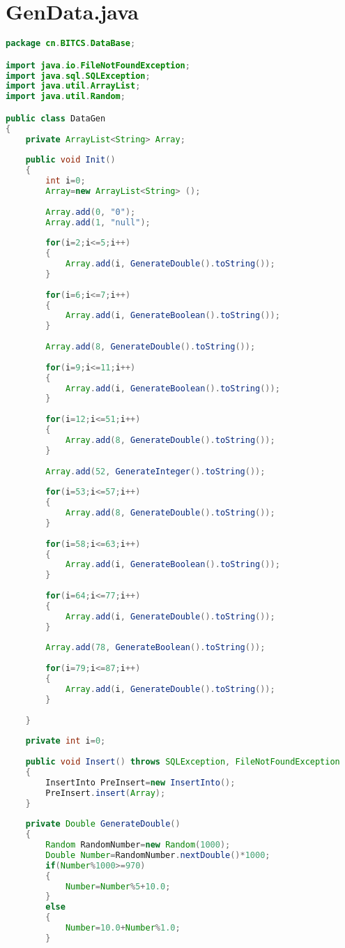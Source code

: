 
\label{Appendix A}

\section{GenData.java}
\label{Section A.1}

\begin{lstlisting}[language = Java]
package cn.BITCS.DataBase;

import java.io.FileNotFoundException;
import java.sql.SQLException;
import java.util.ArrayList;
import java.util.Random;

public class DataGen
{
	private ArrayList<String> Array;
	
	public void Init()
	{
		int i=0;
		Array=new ArrayList<String> ();
		
		Array.add(0, "0");
		Array.add(1, "null");
		
		for(i=2;i<=5;i++)
		{
			Array.add(i, GenerateDouble().toString());
		}
		
		for(i=6;i<=7;i++)
		{
			Array.add(i, GenerateBoolean().toString());
		}
		
		Array.add(8, GenerateDouble().toString());
		
		for(i=9;i<=11;i++)
		{
			Array.add(i, GenerateBoolean().toString());
		}
		
		for(i=12;i<=51;i++)
		{
			Array.add(8, GenerateDouble().toString());
		}
		
		Array.add(52, GenerateInteger().toString());
		
		for(i=53;i<=57;i++)
		{
			Array.add(8, GenerateDouble().toString());
		}
		
		for(i=58;i<=63;i++)
		{
			Array.add(i, GenerateBoolean().toString());
		}
		
		for(i=64;i<=77;i++)
		{
			Array.add(i, GenerateDouble().toString());
		}
		
		Array.add(78, GenerateBoolean().toString());
		
		for(i=79;i<=87;i++)
		{
			Array.add(i, GenerateDouble().toString());
		}
		
	}
	
	private int i=0;
	
	public void Insert() throws SQLException, FileNotFoundException
	{
		InsertInto PreInsert=new InsertInto();
		PreInsert.insert(Array);
	}
	
	private Double GenerateDouble()
	{
		Random RandomNumber=new Random(1000);
		Double Number=RandomNumber.nextDouble()*1000;
		if(Number%1000>=970)
		{
			Number=Number%5+10.0;
		}
		else
		{
			Number=10.0+Number%1.0;
		}
		

\end{lstlisting}
